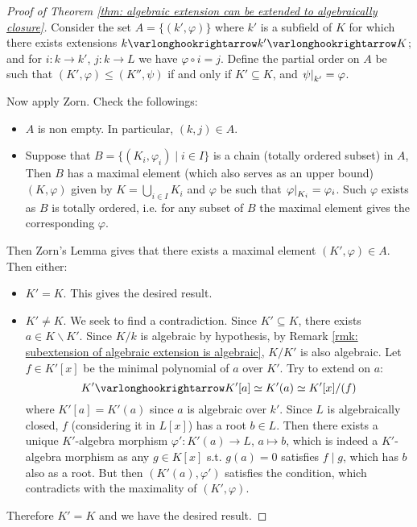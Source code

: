 \documentclass{article}
\begin{document}
\begin{proof}[Proof of Theorem \ref{thm: algebraic extension can be extended to algebraically closure}]
    Consider the set $A = \{ (k', \varphi) \}$ where $k'$ is a subfield of $K$ for which there exists extensions $k \ext k' \ext K$; and for $i: k \to k'$, $j: k \to L$ we have $\varphi \circ i = j$. Define the partial order on $A$ be such that $(K', \varphi) \leq (K'', \psi)$ if and only if $K' \subseteq K$, and $\left.\psi\right|_{k'} = \varphi$.

    Now apply Zorn. Check the followings:
    \begin{itemize}
        \item $A$ is non empty. In particular, $(k, j) \in A$.
        \item Suppose that $B = \{ (K_i, \varphi_i) \mid i \in I \}$ is a chain (totally ordered subset) in $A$, Then $B$ has a maximal element (which also serves as an upper bound) $(K, \varphi)$ given by $K = \bigcup_{i \in I} K_i$ and $\varphi$ be such that $\left.\varphi\right|_{K_i} = \varphi_i$. Such $\varphi$ exists as $B$ is totally ordered, i.e. for any subset of $B$ the maximal element gives the corresponding $\varphi$.
    \end{itemize}
    Then Zorn's Lemma gives that there exists a maximal element $(K', \varphi) \in A$. Then either:
    \begin{itemize}
        \item $K' = K$. This gives the desired result. 
        \item $K' \neq K$. We seek to find a contradiction. Since $K' \subseteq K$, there exists $a \in K \smallsetminus K'$. Since $K/k$ is algebraic by hypothesis, by Remark \ref{rmk: subextension of algebraic extension is algebraic}, $K/K'$ is also algebraic. Let $f \in K'[x]$ be the minimal polynomial of $a$ over $K'$. Try to extend on $a$: 
        \[
            K' \ext K'[a] \simeq K'(a) \simeq K'[x]/(f)
        \]
        where $K'[a] = K'(a)$ since $a$ is algebraic over $k'$. Since $L$ is algebraically closed, $f$ (considering it in $L[x]$) has a root $b \in L$. Then there exists a unique $K'$-algebra morphism $\varphi': K'(a) \to L$, $a \mapsto b$, which is indeed a $K'$-algebra morphism as any $g \in K[x]$ s.t. $g(a) = 0$ satisfies $f \mid g$, which has $b$ also as a root. But then $(K'(a), \varphi')$ satisfies the condition, which contradicts with the maximality of $(K', \varphi)$.
    \end{itemize}
    Therefore $K' = K$ and we have the desired result.
\end{proof}
\end{document}
